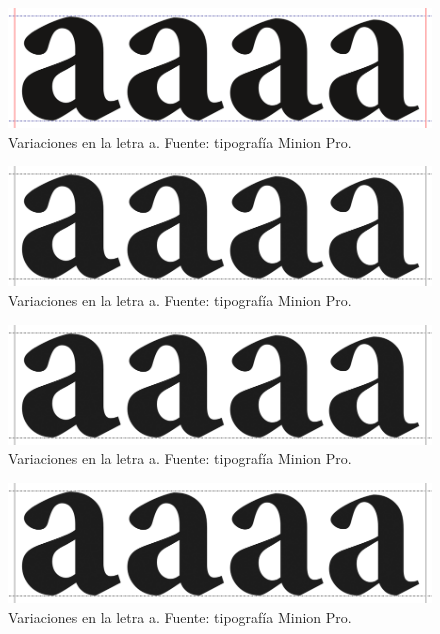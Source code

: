 \ifPDF
\begin{figure}[!ht]
\centering
\includegraphics[width=\textwidth]{./media/letraA.png}
\caption{Variaciones en la letra a. Fuente: tipografía Minion Pro.}\label{figura1-1}
\end{figure}
	\else
	\ifBNPDF
	\begin{figure}[!ht]
	\centering
	\includegraphics[width=\textwidth]{./media/letraa.png}
	\caption{Variaciones en la letra a. Fuente: tipografía Minion Pro.}\label{figura1-1}
	\end{figure}
		\else
		\ifPNGEPUB
		\begin{figure}[!ht]
		\centering
		\includegraphics[width=\textwidth]{./media/letraa.png}
		\caption{Variaciones en la letra a. Fuente: tipografía Minion Pro.}\label{figura1-1}
		\end{figure}
			\else
			\ifHTMLEPUB
			\begin{figure}[h]
			\includegraphics[width=\textwidth]{./media/letraa.png}
			\caption{Variaciones en la letra a. Fuente: tipografía Minion Pro.}\label{figura1-1}
			\end{figure}
			\fi
		\fi
	\fi
\fi

